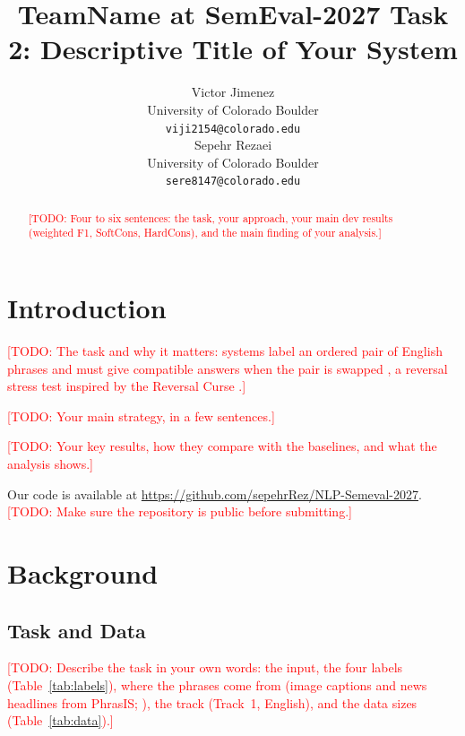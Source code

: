 \documentclass[11pt]{article}
\title{TeamName at SemEval-2027 Task 2: Descriptive Title of Your System}
\author{Victor Jimenez \\
  University of Colorado Boulder \\
  \texttt{viji2154@colorado.edu} \\\And
  Sepehr Rezaei \\
  University of Colorado Boulder \\
  \texttt{sere8147@colorado.edu} \\}
\newcommand{\todo}[1]{\textcolor{red}{[TODO: #1]}}
\begin{document}
\maketitle

\begin{abstract}
\todo{Four to six sentences: the task, your approach, your main dev results (weighted F1, SoftCons, HardCons), and the main finding of your analysis.}
\end{abstract}

\section{Introduction}

\todo{The task and why it matters: systems label an ordered pair of English phrases and must give compatible answers when the pair is swapped \citep{dico-nli-2027-task}, a reversal stress test inspired by the Reversal Curse \citep{berglund2024reversal}.}

\todo{Your main strategy, in a few sentences.}

\todo{Your key results, how they compare with the baselines, and what the analysis shows.}

Our code is available at \url{https://github.com/sepehrRez/NLP-Semeval-2027}.
\todo{Make sure the repository is public before submitting.}

\section{Background}

\subsection{Task and Data}

\todo{Describe the task in your own words: the input, the four labels (Table~\ref{tab:labels}), where the phrases come from (image captions and news headlines from PhrasIS; \citealp{lopezgazpio2024phrasis}), the track (Track~1, English), and the data sizes (Table~\ref{tab:data}).}
\end{document}
